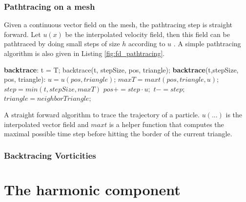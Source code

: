 
\subsubsection{Pathtracing on a mesh}
Given a continuous vector field on the mesh, the pathtracing step is straight forward. Let $u(x)$ be the interpolated velocity field, then this field can be pathtraced by doing small steps of size $h$ according to $u$ . A simple pathtracing algorithm is also given in Listing \ref{fig:fd_pathtracing}. %

\begin{listing}
\begin{algorithmic} %
\STATE \hspace{-0.3cm}\textbf{backtrace}:
\STATE t = T;
\STATE backtrace(t, stepSize, pos, triangle);
\ENDWHILE
\STATE
\STATE \hspace{-0.3cm}\textbf{backtrace}(t,stepSize, pos, triangle):
\STATE $u = u(pos, triangle)$;
\STATE $maxT = maxt(pos, triangle, u)$;
\STATE $step = min(t, stepSize, maxT)$
\STATE $pos += step \cdot u;$
\STATE $t-= step;$
\ENDIF
{}
\STATE $triangle = neighborTriangle$; %
\ENDIF
\end{algorithmic}
\caption{A straight forward algorithm to trace  the trajectory of a particle. $u(...)$ is the interpolated vector field and $maxt$ is a helper function that computes the maximal possible time step before hitting the border of the current triangle.}
\label{fig:fd_pathtracing}
\end{listing}

\subsubsection{Backtracing Vorticities}



\section{The harmonic component} 

